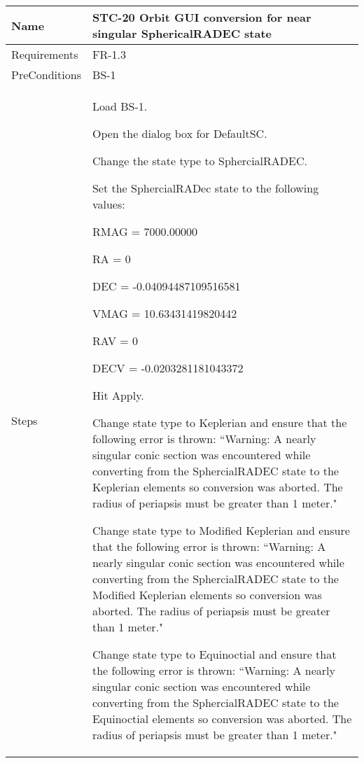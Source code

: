 \begin{table}[htbp!]
\centering
      \begin{tabular}{|p{1.05 in} |p{4.75 in} |}
      \hline
         \rowcolor[rgb]{0.8,0.8,0.8} Name & STC-20 Orbit GUI conversion for near singular SphericalRADEC state \\
         \hline
         Requirements & FR-1.3\\  \hline
         PreConditions & BS-1\\     \hline
        Steps &
         \begin{compactenum}
             \item Load BS-1.
             \item Open the dialog box for DefaultSC.
             \item Change the state type to SphercialRADEC.
             \item Set the SphercialRADec state to the following values:
                 \begin{compactenum}
                    \item RMAG  = 7000.00000
                    \item RA = 0
                    \item DEC = -0.04094487109516581
                    \item VMAG = 10.63431419820442
                    \item RAV = 0
                    \item DECV = -0.0203281181043372
                    \end{compactenum}
             \item Hit Apply.
             \item Change state type to Keplerian and ensure that the following error is thrown: ``Warning: A nearly singular conic section was encountered while converting from the SphercialRADEC state to the Keplerian elements so conversion was aborted.  The radius of periapsis must be greater than 1 meter."
             \item Change state type to Modified Keplerian and ensure that the following error is thrown: ``Warning: A nearly singular conic section was encountered while converting from the SphercialRADEC state to the Modified Keplerian elements so conversion was aborted.  The radius of periapsis must be greater than 1 meter."
             \item Change state type to Equinoctial and ensure that the following error is thrown:  ``Warning: A nearly singular conic section was encountered while converting from the SphercialRADEC state to the Equinoctial elements so conversion was aborted.  The radius of periapsis must be greater than 1 meter."

\end{compactenum}
\end{tabular}
\end{table}
